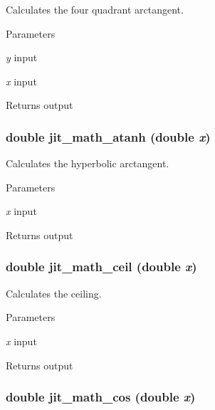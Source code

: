 Calculates the four quadrant arctangent. 
\begin{DoxyParams}{Parameters}
\item[{\em y}]input \item[{\em x}]input \end{DoxyParams}
\begin{DoxyReturn}{Returns}
output 
\end{DoxyReturn}
\hypertarget{group__mathmod_gaae4361174ece63c93cf437e0b8dfffdd}{
\subsubsection[{jit\_\-math\_\-atanh}]{\setlength{\rightskip}{0pt plus 5cm}double jit\_\-math\_\-atanh (double {\em x})}}
\label{group__mathmod_gaae4361174ece63c93cf437e0b8dfffdd}


Calculates the hyperbolic arctangent. 
\begin{DoxyParams}{Parameters}
\item[{\em x}]input \end{DoxyParams}
\begin{DoxyReturn}{Returns}
output 
\end{DoxyReturn}
\hypertarget{group__mathmod_gaf27743b2c312d333f499b8dda5d6e5e9}{
\subsubsection[{jit\_\-math\_\-ceil}]{\setlength{\rightskip}{0pt plus 5cm}double jit\_\-math\_\-ceil (double {\em x})}}
\label{group__mathmod_gaf27743b2c312d333f499b8dda5d6e5e9}


Calculates the ceiling. 
\begin{DoxyParams}{Parameters}
\item[{\em x}]input \end{DoxyParams}
\begin{DoxyReturn}{Returns}
output 
\end{DoxyReturn}
\hypertarget{group__mathmod_ga4be34e0f44fdf1f7d9e7fe5bab1e641b}{
\subsubsection[{jit\_\-math\_\-cos}]{\setlength{\rightskip}{0pt plus 5cm}double jit\_\-math\_\-cos (double {\em x})}}
\label{group__mathmod_ga4be34e0f44fdf1f7d9e7fe5bab1e641b}


